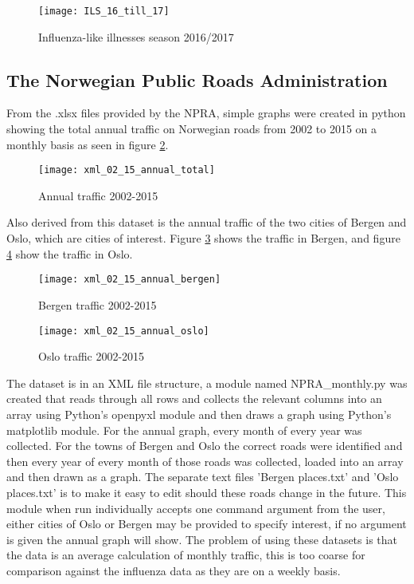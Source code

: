\begin{figure}[ht]
\texttt{[image: ILS\_16\_till\_17]}
\centering
\caption{Influenza-like illnesses season 2016/2017}
\label{fig:ilsstat}
\end{figure}

\newpage









\subsection{The Norwegian Public Roads Administration}
From the .xlsx files provided by the NPRA, simple graphs were created in python showing the total annual traffic on Norwegian roads from 2002 to 2015 on a monthly basis as seen in figure \ref{fig:anualtotal}.

\begin{figure}[ht]
\texttt{[image: xml\_02\_15\_annual\_total]}
\centering
\caption{Annual traffic 2002-2015}
\label{fig:anualtotal}
\end{figure}

Also derived from this dataset is the annual traffic of the two cities of Bergen and Oslo, which are cities of interest. Figure \ref{fig:anualbergen} shows the traffic in Bergen, and figure \ref{fig:anualoslo} show the traffic in Oslo.

\begin{figure}[ht]
\texttt{[image: xml\_02\_15\_annual\_bergen]}
\centering
\caption{Bergen traffic 2002-2015}
\label{fig:anualbergen}
\end{figure}

\begin{figure}[ht]
\texttt{[image: xml\_02\_15\_annual\_oslo]}
\centering
\caption{Oslo traffic 2002-2015}
\label{fig:anualoslo}
\end{figure}
The dataset is in an XML file structure, a module named NPRA\_monthly.py was created that reads through all rows and collects the relevant columns into an array using Python's openpyxl module and then draws a graph using Python's matplotlib module. For the annual graph, every month of every year was collected. For the towns of Bergen and Oslo the correct roads were identified and then every year of every month of those roads was collected, loaded into an array and then drawn as a graph. The separate text files 'Bergen places.txt' and 'Oslo places.txt' is to make it easy to edit should these roads change in the future. This module when run individually accepts one command argument from the user, either cities of Oslo or Bergen may be provided to specify interest, if no argument is given the annual graph will show. The problem of using these datasets is that the data is an average calculation of monthly traffic, this is too coarse for comparison against the influenza data as they are on a weekly basis.

